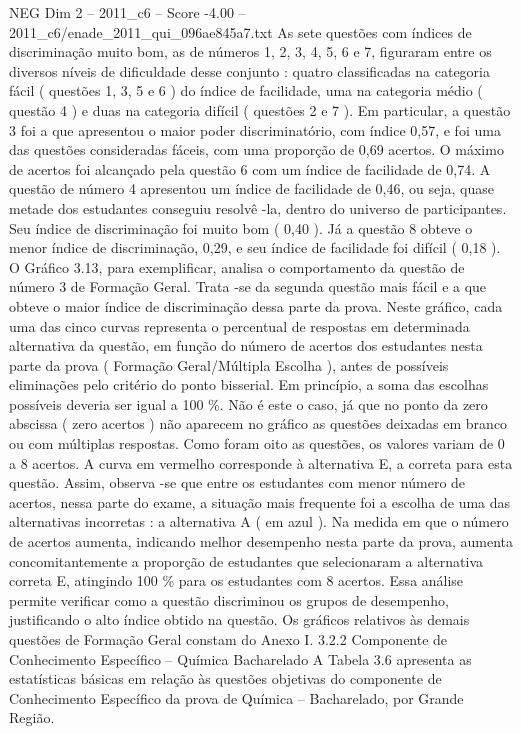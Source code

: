 \begin{textsample}{NEG Dim 2 – 2011\_c6 – Score -4.00 – 2011\_c6/enade\_2011\_qui\_096ae845a7.txt}
As sete questões com índices de discriminação muito bom, as de números 1, 2, 3, 4, 5, 6 e 7, figuraram entre os diversos níveis de dificuldade desse conjunto : quatro classificadas na categoria fácil ( questões 1, 3, 5 e 6 ) do índice de facilidade, uma na categoria médio ( questão 4 ) e duas na categoria difícil ( questões 2 e 7 ).
Em particular, a questão 3 foi a que apresentou o maior poder discriminatório, com índice 0,57, e foi uma das questões consideradas fáceis, com uma proporção de 0,69 acertos.
O máximo de acertos foi alcançado pela questão 6 com um índice de facilidade de 0,74.
A questão de número 4 apresentou um índice de facilidade de 0,46, ou seja, quase metade dos estudantes conseguiu resolvê -la, dentro do universo de participantes.
Seu índice de discriminação foi muito bom ( 0,40 ).
Já a questão 8 obteve o menor índice de discriminação, 0,29, e seu índice de facilidade foi difícil ( 0,18 ).
O Gráfico 3.13, para exemplificar, analisa o comportamento da questão de número 3 de Formação Geral.
Trata -se da segunda questão mais fácil e a que obteve o maior índice de discriminação dessa parte da prova.
Neste gráfico, cada uma das cinco curvas representa o percentual de respostas em determinada alternativa da questão, em função do número de acertos dos estudantes nesta parte da prova ( Formação Geral/Múltipla Escolha ), antes de possíveis eliminações pelo critério do ponto bisserial.
Em princípio, a soma das escolhas possíveis deveria ser igual a 100 \%.
Não é este o caso, já que no ponto da zero abscissa ( zero acertos ) não aparecem no gráfico as questões deixadas em branco ou com múltiplas respostas.
Como foram oito as questões, os valores variam de 0 a 8 acertos.
A curva em vermelho corresponde à alternativa E, a correta para esta questão.
Assim, observa -se que entre os estudantes com menor número de acertos, nessa parte do exame, a situação mais frequente foi a escolha de uma das alternativas incorretas : a alternativa A ( em azul ).
Na medida em que o número de acertos aumenta, indicando melhor desempenho nesta parte da prova, aumenta concomitantemente a proporção de estudantes que selecionaram a alternativa correta E, atingindo 100 \% para os estudantes com 8 acertos.
Essa análise permite verificar como a questão discriminou os grupos de desempenho, justificando o alto índice obtido na questão.
Os gráficos relativos às demais questões de Formação Geral constam do Anexo I. 3.2.2 Componente de Conhecimento Específico – Química Bacharelado A Tabela 3.6 apresenta as estatísticas básicas em relação às questões objetivas do componente de Conhecimento Específico da prova de Química – Bacharelado, por Grande Região.

\end{textsample}
